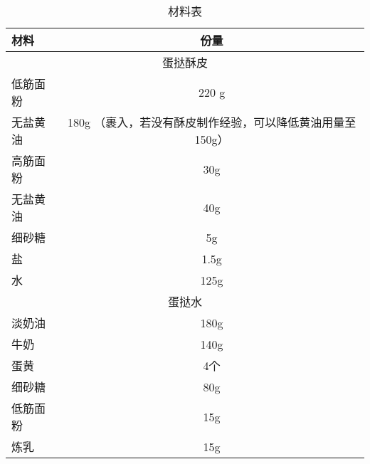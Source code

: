 \begin{table}[h]
    \centering
    \begin{tabular}{|l||c|}\hline
     \textbf{材料}    &  \textbf{份量}\\ \hline\hline
    \multicolumn{2}{|c|}{蛋挞酥皮}\\ \hline
    低筋面粉     &  220 g \\ \hline
    无盐黄油     &  180g （裹入，若没有酥皮制作经验，可以降低黄油用量至150g）\\ \hline
    高筋面粉  & 30g  \\ \hline
    无盐黄油 &  40g  \\ \hline
    细砂糖     &  5g \\ \hline
    盐     & 1.5g  \\ \hline
    水     & 125g  \\ \hline
    \multicolumn{2}{|c|}{蛋挞水}\\ \hline
    淡奶油     &  180g \\ \hline
    牛奶     &  140g \\ \hline
    蛋黄     &  4个 \\ \hline
    细砂糖 & 80g  \\ \hline
    低筋面粉 & 15g \\ \hline
    炼乳 & 15g \\ \hline
    \end{tabular}
    \caption{材料表}
\end{table}

